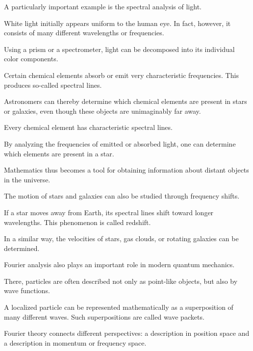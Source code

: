A particularly important example is the spectral analysis of light.

White light initially appears uniform to the human eye.
In fact, however, it consists of many different wavelengths or frequencies.

Using a prism or a spectrometer,
light can be decomposed into its individual color components.

Certain chemical elements absorb or emit very characteristic frequencies.
This produces so-called spectral lines.

Astronomers can thereby determine
which chemical elements are present in stars or galaxies,
even though these objects are unimaginably far away.

\begin{PhysicsBox}
	\small
	\label{box:fourier-spektrallinien-signatur}
	Every chemical element has characteristic spectral lines.
	
	By analyzing the frequencies of emitted or absorbed light,
	one can determine
	which elements are present in a star.
	
	Mathematics thus becomes a tool
	for obtaining information about distant objects in the universe.
\end{PhysicsBox}

The motion of stars and galaxies can also be studied
through frequency shifts.

If a star moves away from Earth,
its spectral lines shift toward longer wavelengths.
This phenomenon is called redshift.

In a similar way, the velocities of stars,
gas clouds,
or rotating galaxies can be determined.

\medskip

Fourier analysis also plays an important role in modern quantum mechanics.

There, particles are often described not only as point-like objects,
but also by wave functions.

A localized particle can be represented mathematically
as a superposition of many different waves.
Such superpositions are called wave packets.

Fourier theory connects different perspectives:
a description in position space
and a description in momentum or frequency space.

